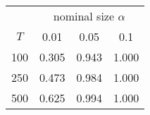 % 
\begin{tabular}{cccc}
  \hline
  & \multicolumn{3}{c}{nominal size $\alpha$} \\
 $T$ & 0.01 & 0.05 & 0.1 \\
 \hline
100 & 0.305 & 0.943 & 1.000 \\ 
  250 & 0.473 & 0.984 & 1.000 \\ 
  500 & 0.625 & 0.994 & 1.000 \\ 
   \hline
\end{tabular}
